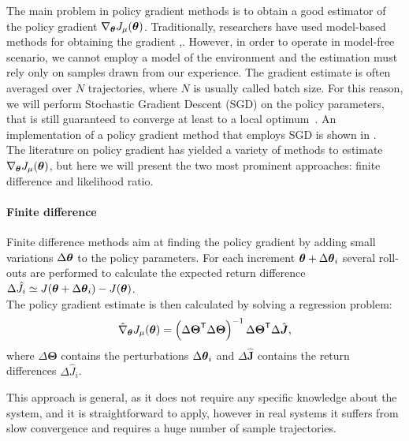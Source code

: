 \newcommand{\gradjhat}{\hat{\nabla}_{\vtheta}J_{\mu}(\vtheta)}
\newcommand{\elig}[1][\vtheta]{\nabla_{#1}\log\pi_{#1}(a|s)}

The main problem in policy gradient methods is to obtain a good estimator of the policy gradient $\nabla_{{\boldsymbol{\theta}}}J_\mu({\boldsymbol{\theta}})$. Traditionally, researchers have used model-based methods for obtaining the gradient \cite{dyer1970computation},\cite{hasdorff1976gradient}. However, in order to operate in model-free scenario, we cannot employ a model of the environment and the estimation must rely only on samples drawn from our experience. The gradient estimate is often averaged over $N$ trajectories, where $N$ is usually called batch size. For this reason, we will perform Stochastic Gradient Descent (SGD) on the policy parameters, that is still guaranteed to converge at least to a local optimum~\cite{kiefer1952}. An implementation of a policy gradient method that employs SGD is shown in .\\
The literature on policy gradient has yielded a variety of methods to estimate $\nabla_{{\boldsymbol{\theta}}}J_\mu({\boldsymbol{\theta}})$, but here we will present the two most prominent approaches: finite difference and likelihood ratio.
%
\paragraph{Finite difference}
Finite difference methods aim at finding the policy gradient by adding small variations $\Delta{\boldsymbol{\theta}}$ to the policy parameters. For each increment ${\boldsymbol{\theta}} + \Delta{\boldsymbol{\theta}}_i$ several roll-outs are performed to calculate the expected return difference $\Delta\hat{J}_i \simeq J({\boldsymbol{\theta}} + \Delta{\boldsymbol{\theta}}_i) - J({\boldsymbol{\theta}})$.\\
The policy gradient estimate is then calculated by solving a regression problem:
\[
\hat{\nabla}_{{\boldsymbol{\theta}}}J_\mu({\boldsymbol{\theta}}) = \left({\Delta\boldsymbol{\Theta}}^{\mathsf{T}}\Delta\boldsymbol{\Theta}\right)^{-1}{\Delta\boldsymbol{\Theta}}^{\mathsf{T}}\Delta\hat{\boldsymbol{J}},
\]
where $\Delta\boldsymbol{\Theta}$ contains the perturbations $\Delta{\boldsymbol{\theta}}_i$ and $\Delta\hat{\boldsymbol{J}}$ contains the return differences $\Delta\hat{J}_i$.

This approach is general, as it does not require any specific knowledge about the system, and it is straightforward to apply, however in real systems it suffers from slow convergence and requires a huge number of sample trajectories.

